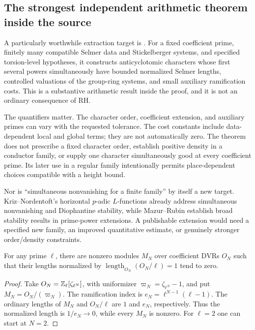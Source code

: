 \subsection{The strongest independent arithmetic theorem inside the source}

A particularly worthwhile extraction target is
.
For a fixed coefficient prime, finitely many compatible Selmer data and Stickelberger systems, and specified torsion-level hypotheses, it constructs anticyclotomic characters whose first several powers simultaneously have bounded normalized Selmer lengths, controlled valuations of the group-ring systems, and small auxiliary ramification costs. This is a substantive arithmetic result inside the proof, and it is not an ordinary consequence of RH.\cite{selmer}

The quantifiers matter. The character order, coefficient extension, and auxiliary primes can vary with the requested tolerance. The cost constants include data-dependent local and global terms; they are not automatically zero. The theorem does not prescribe a fixed character order, establish positive density in a conductor family, or supply one character simultaneously good at every coefficient prime. Its later use in a regular family intentionally permits place-dependent choices compatible with a height bound.

Nor is ``simultaneous nonvanishing for a finite family'' by itself a new target. Kriz--Nordentoft's horizontal $p$-adic $L$-functions already address simultaneous nonvanishing and Diophantine stability, while Mazur--Rubin establish broad stability results in prime-power extensions. A publishable extension would need a specified new family, an improved quantitative estimate, or genuinely stronger order/density constraints.\cite{kriznordentoft,mazurrubin}

\begin{proposition}\label{prop:length-warning}
For any prime $\ell$, there are nonzero modules $M_N$ over coefficient DVRs $O_N$ such that their lengths normalized by $\operatorname{length}_{O_N}(O_N/\ell)=1$ tend to zero.
\end{proposition}
\begin{proof}
Take $O_N=\mathbb Z_\ell[\zeta_{\ell^N}]$, with uniformizer $\varpi_N=\zeta_{\ell^N}-1$, and put $M_N=O_N/(\varpi_N)$. The ramification index is
$e_N=\ell^{N-1}(\ell-1)$. The ordinary lengths of $M_N$ and $O_N/\ell$ are $1$ and $e_N$, respectively. Thus the normalized length is $1/e_N\to0$, while every $M_N$ is nonzero. For $\ell=2$ one can start at $N=2$.
\end{proof}

